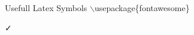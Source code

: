 \documentclass{beamer}
\begin{document}
\begin{frame}{Usefull Latex Symbols}
	$\backslash$usepackage\{\alert{fontawesome}\}\par
	{\faBtc}{\faIls}{\faKrw}{\faUsd}{\faEur}{\faInr}{\faRub}{\faViacoin}{\faGbp}
	{\faJpy}{\faTry}{\faCopyright}{\faRegistered}{\faCreativeCommons}
	{\faTrademark}{\faMars}{\faMoonO}{\faVenus}{\faMercury}{\faSunO}
	{\faArrowCircleDown}{\faArrowDown}{\faLongArrowDown}{\faArrowCircleLeft}
	{\faArrowLeft}{\faLongArrowLeft}{\faArrowCircleODown}{\faArrowRight}
	{\faLongArrowRight}{\faArrowCircleOLeft}{\faArrows}{\faLongArrowUp}
	{\faArrowCircleORight}{\faArrowsAlt}{\faRepeat}{\faArrowCircleOUp}
	{\faArrowsH}{\faUndo}{\faArrowCircleRight}{\faArrowsV}{\faArrowCircleUp}
	{\faArrowUp}{\faChevronCircleDown}{\faChevronCircleUp}{\faChevronRight}
	{\faChevronCircleLeft}{\faChevronDown}{\faChevronUp}{\faChevronCircleRight}
	{\faChevronLeft}{\faPencil}{\faPencilSquare}{\faPencilSquareO}{\faCheck}
	{\faCheckSquare}{\faTimesCircle}{\faCheckCircle}{\faCheckSquareO}
	{\faTimesCircleO}{\faStar}{\faStarHalf}{\faStarHalfO}{\faStarO}{\faCircle}
	{\faCircleONotch}{\faDotCircleO}{\faSquareO}{\faCircleO}{\faCircleThin}
	{\faSquare}{\faAmazon}{\faAnchor}{\faAndroid}{\faApple}{\faArchive}
	{\faAreaChart}{\faAsterisk}{\faAt}{\faBan}{\faBarChart}{\faFighterJet}
	{\faFile}{\faFileArchiveO}{\faFileAudioO}{\faFileCodeO}{\faFileExcelO}
	{\faFileImageO}{\faFileO}{\faFilePdfO}{\faFilePowerpointO}{\faFilesO}
	{\faFileText}{\faFileTextO}{\faFileVideoO}{\faFileWordO}{\faFirefox}
	{\faFolder}{\faFolderO}{\faFolderOpen}{\faFolderOpenO}{\faFont}{\faPlane}
	{\faPowerOff}{\faPrint}{\faQq}{\faQrcode}{\faQuestion}{\faQuestionCircle}
	{\faRecycle}{\faReddit}{\faRefresh}{\faReply}{\faRocket}{\faRss}
	{\faRssSquare}{\faSafari}{\faBell}{\faBellO}{\faBellSlash}{\faBellSlashO}
	{\faBolt}{\faBook}{\faBookmark}{\faBookmarkO}{\faGg}{\faGgCircle}{\faGit}
	{\faGithub}{\faGithubSquare}{\faGlass}{\faGlobe}{\faGoogle}
	{\faGraduationCap}{\faHeart}{\faHeartbeat}{\faHeartO}{\faHome}
	{\faInternetExplorer}{\faKey}{\faSignal}{\faSkyatlas}{\faSkype}{\faSlack}
	{\faSmileO}{\faSort}{\faSortAlphaAsc}{\faSortAlphaDesc}{\faSortAmountAsc}
	{\faSortAmountDesc}{\faSortNumericAsc}{\faSortNumericDesc}{\faSoundcloud}
	{\faSpaceShuttle}{\faSpinner}{\faStackOverflow}{\faSteam}{\faSteamSquare}
	{\faStickyNote}{\faStickyNote}{\faStop}{\faSubway}{\faChrome}{\faClockO}
	{\faCloudDownload}{\faCloudUpload}{\faCode}{\faCodeFork}{\faCodepen}
	{\faCoffee}{\faCog}{\faCogs}{\faComment}{\faCommentO}{\faComments}
	{\faCommentsO}{\faCube}{\faDesktop}{\faDiamond}{\faDownload}{\faDropbox}

\end{frame}
\end{document}
